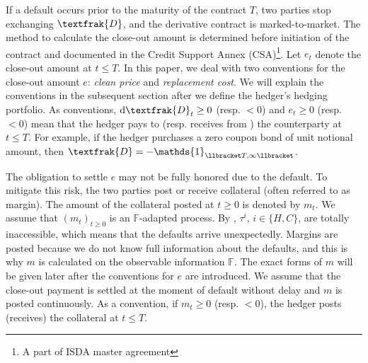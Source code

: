 \documentclass[a4paper, 11pt]{article}              %
\numberwithin{equation}{section}
\theoremstyle{plain}
\newcommand{\1}{\mathds{1}}
\newcommand{\frD}{\textfrak{D}}
\newcommand{\dsF}{\mathbb{F}}
\theoremstyle{plain}
\theoremstyle{definition}
\newtheorem{remark}[thm]{Remark} %
\theoremstyle{plain}
\newtheorem{remark}{Remark}
\newcommand*\df{\mathop{}\!\mathrm{d}}
\begin{document}
\iffalse
\begin{remark}
Note that an $\dsF$-adapted process may depend on default risks, since the
default intensities are $\dsF$-adapted.  
\end{remark}
\fi

If a default occurs prior to the maturity of the contract $T$, two parties stop
exchanging $\frD$, and the derivative contract is marked-to-market. The method
to calculate the close-out amount is determined before initiation of the
contract and documented in the Credit Support Annex (CSA)\footnote{A part of
  ISDA master agreement}. Let $e_t$ denote the close-out amount at $t \leq T$.  In
this paper, we deal with two conventions for the close-out amount $e$:
\textit{clean price} and \textit{replacement cost}.  We will explain the
conventions in the subsequent section after we define the hedger's hedging
portfolio. As conventions, $\df \frD_t \geq0$ (resp. $<0$) and $e_{t} \geq0$
(resp. $<0$) mean that the hedger pays to (resp. receives from ) the
counterparty at $t \leq T$. For example, if the hedger purchases a zero coupon bond of
unit notional amount, then $ \frD = -\1_{\llbracket T, \infty\llbracket}$.
 
The obligation to settle $e$ may not be fully honored due to the default. To
mitigate this risk, the two parties post or receive collateral (often referred to
as margin). The amount of the collateral posted at $t\geq0$ is denoted by $m_t$.
We assume that $(m_t)_{t\geq0}$ is an $\dsF$-adapted process. By
, $\tau^i$, $i \in \{H, C\}$, are totally inaccessible, which
means that the defaults arrive unexpectedly. Margins are posted because we do
not know full information about the defaults, and this is why $m$ is calculated
on the observable information $\dsF$.  The exact forms of $m$ will be given
later after the conventions for $e$ are introduced. We assume that the
close-out payment is settled at the moment of default without delay and $m$ is
posted continuously.  As a convention, if $m_t \geq0$ (resp.  $<0$),    
the hedger posts (receives) the collateral at $t \leq T$.
\end{document}
